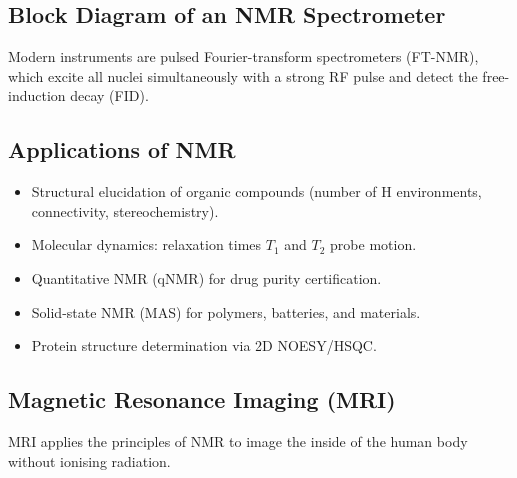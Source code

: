 \documentclass[12pt,a4paper]{article}
\begin{document}
\subsection{Block Diagram of an NMR Spectrometer}
Modern instruments are pulsed Fourier-transform spectrometers (FT-NMR), which excite all nuclei simultaneously with a strong RF pulse and detect the free-induction decay (FID).

\begin{tcolorbox}[tikzbox, title={Block Diagram of FT-NMR}]
\centering
{}
\end{tcolorbox}

\subsection{Applications of NMR}
\begin{itemize}[leftmargin=*, itemsep=2pt, topsep=2pt]
  \item Structural elucidation of organic compounds (number of H environments, connectivity, stereochemistry).
  \item Molecular dynamics: relaxation times $T_1$ and $T_2$ probe motion.
  \item Quantitative NMR (qNMR) for drug purity certification.
  \item Solid-state NMR (MAS) for polymers, batteries, and materials.
  \item Protein structure determination via 2D NOESY/HSQC.
\end{itemize}

\subsection{Magnetic Resonance Imaging (MRI)}
MRI applies the principles of NMR to image the inside of the human body without ionising radiation.
\end{document}
